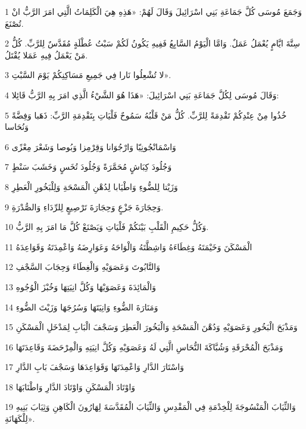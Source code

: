 \par 1 وَجَمَعَ مُوسَى كُلَّ جَمَاعَةِ بَنِي اسْرَائِيلَ وَقَالَ لَهُمْ: «هَذِهِ هِيَ الْكَلِمَاتُ الَّتِي امَرَ الرَّبُّ انْ تُصْنَعَ.
\par 2 سِتَّةَ ايَّامٍ يُعْمَلُ عَمَلٌ. وَامَّا الْيَوْمُ السَّابِعُ فَفِيهِ يَكُونُ لَكُمْ سَبْتُ عُطْلَةٍ مُقَدَّسٌ لِلرَّبِّ. كُلُّ مَنْ يَعْمَلُ فِيهِ عَمَلا يُقْتَلُ.
\par 3 لا تُشْعِلُوا نَارا فِي جَمِيعِ مَسَاكِنِكُمْ يَوْمَ السَّبْتِ».
\par 4 وَقَالَ مُوسَى لِكُلَّ جَمَاعَةِ بَنِي اسْرَائِيلَ: «هَذَا هُوَ الشَّيْءُ الَّذِي امَرَ بِهِ الرَّبُّ قَائِلا:
\par 5 خُذُوا مِنْ عِنْدِكُمْ تَقْدِمَةً لِلرَّبِّ. كُلُّ مَنْ قَلْبُهُ سَمُوحٌ فَلْيَاتِ بِتَقْدِمَةِ الرَّبِّ: ذَهَبا وَفِضَّةً وَنُحَاسا
\par 6 وَاسْمَانْجُونِيّا وَارْجُوَانا وَقِرْمِزا وَبُوصا وَشَعْرَ مِعْزًى
\par 7 وَجُلُودَ كِبَاشٍ مُحَمَّرَةً وَجُلُودَ تُخَسٍ وَخَشَبَ سَنْطٍ
\par 8 وَزَيْتا لِلضُّوءِ وَاطْيَابا لِدُهْنِ الْمَسْحَةِ وَلِلْبَخُورِ الْعَطِرِ
\par 9 وَحِجَارَةَ جَزْعٍ وَحِجَارَةَ تَرْصِيعٍ لِلرِّدَاءِ وَالصُّدْرَةِ.
\par 10 وَكُلُّ حَكِيمِ الْقَلْبِ بَيْنَكُمْ فَلْيَاتِ وَيَصْنَعْ كُلَّ مَا امَرَ بِهِ الرَّبُّ.
\par 11 الْمَسْكَنَ وَخَيْمَتَهُ وَغِطَاءَهُ وَاشِظَّتَهُ وَالْوَاحَهُ وَعَوَارِضَهُ وَاعْمِدَتَهُ وَقَوَاعِدَهُ
\par 12 وَالتَّابُوتَ وَعَصَوَيْهِ وَالْغِطَاءَ وَحِجَابَ السَّجْفِ
\par 13 وَالْمَائِدَةَ وَعَصَوَيْهَا وَكُلَّ انِيَتِهَا وَخُبْزَ الْوُجُوهِ
\par 14 وَمَنَارَةَ الضُّوءِ وَانِيَتَهَا وَسُرُجَهَا وَزَيْتَ الضُّوءِ
\par 15 وَمَذْبَحَ الْبَخُورِ وَعَصَوَيْهِ وَدُهْنَ الْمَسْحَةِ وَالْبَخُورَ الْعَطِرَ وَسَجْفَ الْبَابِ لِمَدْخَلِ الْمَسْكَنِ
\par 16 وَمَذْبَحَ الْمُحْرَقَةِ وَشُبَّاكَةَ النُّحَاسِ الَّتِي لَهُ وَعَصَوَيْهِ وَكُلَّ انِيَتِهِ وَالْمِرْحَضَةَ وَقَاعِدَتَهَا
\par 17 وَاسْتَارَ الدَّارِ وَاعْمِدَتَهَا وَقَوَاعِدَهَا وَسَجْفَ بَابِ الدَّارِ
\par 18 وَاوْتَادَ الْمَسْكَنِ وَاوْتَادَ الدَّارِ وَاطْنَابَهَا
\par 19 وَالثِّيَابَ الْمَنْسُوجَةَ لِلْخِدْمَةِ فِي الْمَقْدِسِ وَالثِّيَابَ الْمُقَدَّسَةَ لِهَارُونَ الْكَاهِنِ وَثِيَابَ بَنِيهِ لِلْكَهَانَةِ».
